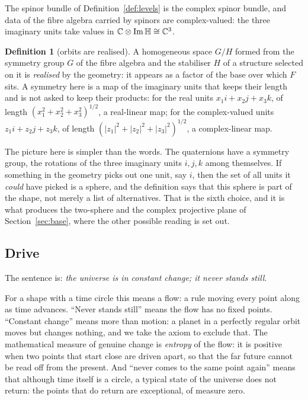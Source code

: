 \documentclass[11pt,a4paper]{article}
\theoremstyle{plain}
\theoremstyle{definition}
\newtheorem{definition}[theorem]{Definition}
\theoremstyle{remark}
\newcommand{\Hquat}{\mathbb{H}}
\newcommand{\ImH}{\operatorname{Im}\Hquat}
\begin{document}
The spinor bundle of Definition~\ref{def:levels} is the complex spinor bundle, and data of the fibre algebra carried by spinors are complex-valued: the three imaginary units take values in $\C\otimes\ImH\cong\C^{3}$.

\begin{definition}[orbits are realised]\label{def:orbits}
A homogeneous space $G/H$ formed from the symmetry group $G$ of the fibre algebra and the stabiliser $H$ of a structure selected on it is \emph{realised} by the geometry: it appears as a factor of the base over which $F$ sits. A symmetry here is a map of the imaginary units that keeps their length and is not asked to keep their products: for the real units $x_{1}i+x_{2}j+x_{3}k$, of length $(x_{1}^{2}+x_{2}^{2}+x_{3}^{2})^{1/2}$, a real-linear map; for the complex-valued units $z_{1}i+z_{2}j+z_{3}k$, of length $(\lvert z_{1}\rvert^{2}+\lvert z_{2}\rvert^{2}+\lvert z_{3}\rvert^{2})^{1/2}$, a complex-linear map.
\end{definition}

The picture here is simpler than the words. The quaternions have a symmetry group, the rotations of the three imaginary units $i,j,k$ among themselves. If something in the geometry picks out one unit, say $i$, then the set of all units it \emph{could} have picked is a sphere, and the definition says that this sphere is part of the shape, not merely a list of alternatives. That is the sixth choice, and it is what produces the two-sphere and the complex projective plane of Section~\ref{sec:base}, where the other possible reading is set out.

\subsection{Drive}\label{sec:A4}

The sentence is: \emph{the universe is in constant change; it never stands still}.

For a shape with a time circle this means a flow: a rule moving every point along as time advances. ``Never stands still'' means the flow has no fixed points. ``Constant change'' means more than motion: a planet in a perfectly regular orbit moves but changes nothing, and we take the axiom to exclude that. The mathematical measure of genuine change is \emph{entropy} of the flow: it is positive when two points that start close are driven apart, so that the far future cannot be read off from the present. And ``never comes to the same point again'' means that although time itself is a circle, a typical state of the universe does not return: the points that do return are exceptional, of measure zero.
\end{document}

